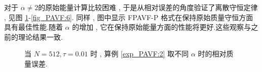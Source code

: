   对于 $\alpha\neq 2$的原始能量计算比较困难 , 于是从相对误差的角度验证了离散守恒定律 , 见图 \ref{fig_PAVF:5}-\ref{fig_PAVF:6}.
  同样 , 图中显示 FPAVF-P 格式在保持原始质量守恒方面具有最佳性能.随着 $\alpha$ 的增加 , 它在保持原始能量方面的性能将更好.这些观察与之前的理论结果一致.

  \begin{figure}[H]
	\begin{center}
	\caption{当 $N = 512 , \tau=0.01$ 时 , 算例 \ref{exp_PAVF:2} 取不同 $\alpha$ 时的相对质量误差.}
	\label{fig_PAVF:5}
	\end{center}
	\end{figure}
	
